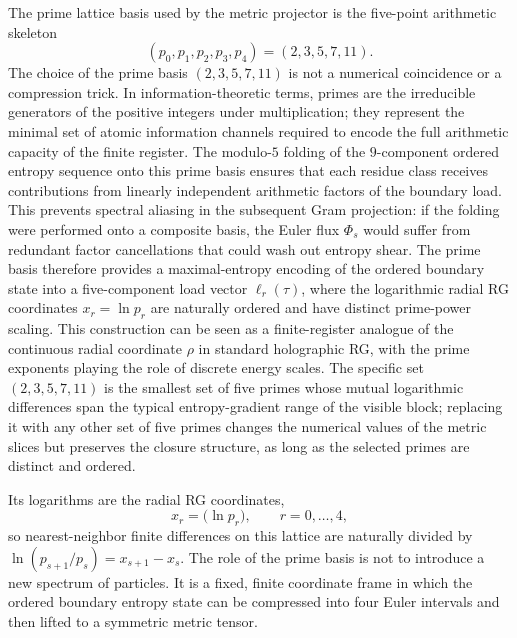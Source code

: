\documentclass[11pt]{article}
\begin{document}
The prime lattice basis used by the metric projector is the five-point
arithmetic skeleton
\begin{equation}
\label{eq:section-five-prime-lattice-basis}
 (p_0,p_1,p_2,p_3,p_4)=(2,3,5,7,11).
\end{equation}
The choice of the prime basis \((2,3,5,7,11)\) is not a numerical coincidence or
a compression trick.  In information-theoretic terms, primes are the
irreducible generators of the positive integers under multiplication; they
represent the minimal set of atomic information channels required to encode the
full arithmetic capacity of the finite register.  The modulo-\(5\) folding of
the \(9\)-component ordered entropy sequence onto this prime basis ensures that
each residue class receives contributions from linearly independent arithmetic
factors of the boundary load.  This prevents spectral aliasing in the subsequent
Gram projection: if the folding were performed onto a composite basis, the
Euler flux \(\Phi_s\) would suffer from redundant factor cancellations that
could wash out entropy shear.  The prime basis therefore provides a
maximal-entropy encoding of the ordered boundary state into a five-component
load vector \(\ell_r(\tau)\), where the logarithmic radial RG coordinates
\(x_r=\ln p_r\) are naturally ordered and have distinct prime-power scaling.
This construction can be seen as a finite-register analogue of the continuous
radial coordinate \(\rho\) in standard holographic RG, with the prime exponents
playing the role of discrete energy scales.  The specific set \((2,3,5,7,11)\)
is the smallest set of five primes whose mutual logarithmic differences span
the typical entropy-gradient range of the visible block; replacing it with any
other set of five primes changes the numerical values of the metric slices but
preserves the closure structure, as long as the selected primes are distinct and
ordered.

Its logarithms are the radial RG coordinates,
\begin{equation}
\label{eq:section-five-log-prime-coordinate}
 x_r=\bigl(\ln p_r\bigr),
 \qquad
 r=0,
\ldots,4,
\end{equation}
so nearest-neighbor finite differences on this lattice are naturally divided by
$\ln(p_{s+1}/p_s)=x_{s+1}-x_s$.  The role of the prime basis is not to introduce
a new spectrum of particles.  It is a fixed, finite coordinate frame in which
the ordered boundary entropy state can be compressed into four Euler intervals
and then lifted to a symmetric metric tensor.
\end{document}
